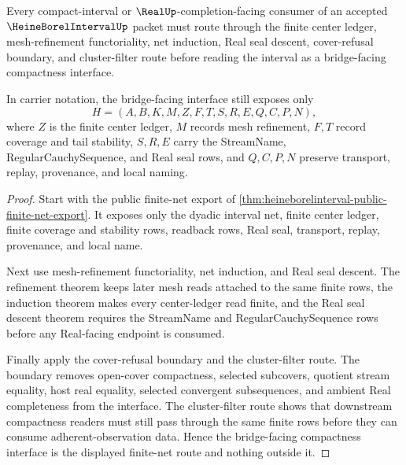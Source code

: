 \begin{theorem}
\label{thm:heine-borel-interval-bridged-finite-net-interface}
Every compact-interval or $\RealUp$-completion-facing consumer of an accepted $\HeineBorelIntervalUp$ packet must route through the finite center ledger, mesh-refinement functoriality, net induction, Real seal descent, cover-refusal boundary, and cluster-filter route before reading the interval as a bridge-facing compactness interface.

In carrier notation, the bridge-facing interface still exposes only
$$
H=(A,B,K,M,Z,F,T,S,R,E,Q,C,P,N),
$$
where $Z$ is the finite center ledger, $M$ records mesh refinement, $F,T$ record coverage and tail stability, $S,R,E$ carry the StreamName, RegularCauchySequence, and Real seal rows, and $Q,C,P,N$ preserve transport, replay, provenance, and local naming.
\end{theorem}
\begin{proof}
Start with the public finite-net export of \autoref{thm:heineborelinterval-public-finite-net-export}. It exposes only the dyadic interval net, finite center ledger, finite coverage and stability rows, readback rows, Real seal, transport, replay, provenance, and local name.

Next use mesh-refinement functoriality, net induction, and Real seal descent. The refinement theorem keeps later mesh reads attached to the same finite rows, the induction theorem makes every center-ledger read finite, and the Real seal descent theorem requires the StreamName and RegularCauchySequence rows before any Real-facing endpoint is consumed.

Finally apply the cover-refusal boundary and the cluster-filter route. The boundary removes open-cover compactness, selected subcovers, quotient stream equality, host real equality, selected convergent subsequences, and ambient Real completeness from the interface. The cluster-filter route shows that downstream compactness readers must still pass through the same finite rows before they can consume adherent-observation data. Hence the bridge-facing compactness interface is the displayed finite-net route and nothing outside it.
\end{proof}


